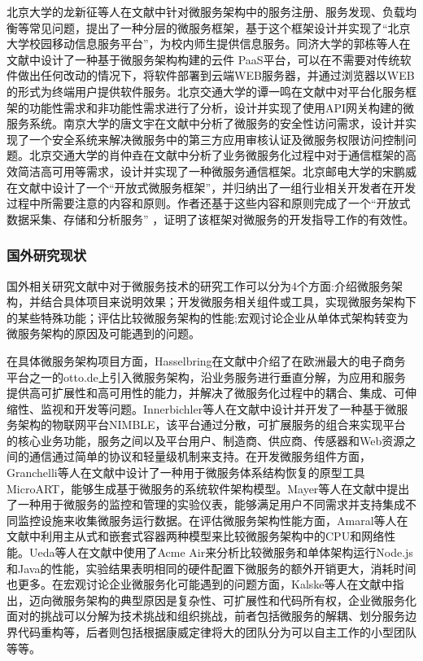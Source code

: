 北京大学的龙新征等人在文献\cite{龙新征2017基于微服务框架的信息服务平台}中针对微服务架构中的服务注册、服务发现、负载均衡等常见问题，提出了一种分层的微服务框架，基于这个框架设计并实现了“北京大学校园移动信息服务平台”，为校内师生提供信息服务。同济大学的郭栋等人在文献\cite{郭栋2015一种基于微服务架构的新型云件}中设计了一种基于微服务架构构建的云件 PaaS平台，可以在不需要对传统软件做出任何改动的情况下，将软件部署到云端WEB服务器，并通过浏览器以WEB的形式为终端用户提供软件服务。北京交通大学的谭一鸣在文献\cite{谭一鸣2017基于微服务架构的平台化服务框架的设计与实现}中对平台化服务框架的功能性需求和非功能性需求进行了分析，设计并实现了使用API网关构建的微服务系统。南京大学的唐文宇在文献\cite{唐文宇2016面向}中分析了微服务的安全性访问需求，设计并实现了一个安全系统来解决微服务中的第三方应用审核认证及微服务权限访问控制问题。北京交通大学的肖仲垚在文献\cite{肖仲垚2017微服务通信框架的设计与实现}中分析了业务微服务化过程中对于通信框架的高效简洁高可用等需求，设计并实现了一种微服务通信框架。北京邮电大学的宋鹏威在文献\cite{宋鹏威2017开放式微服务框架的设计与应用}中设计了一个“开放式微服务框架”，并归纳出了一组行业相关开发者在开发过程中所需要注意的内容和原则。作者还基于这些内容和原则完成了一个“开放式数据采集、存储和分析服务” ，证明了该框架对微服务的开发指导工作的有效性。

\subsubsection{国外研究现状}
国外相关研究文献中对于微服务技术的研究工作可以分为4个方面:介绍微服务架构，并结合具体项目来说明效果；开发微服务相关组件或工具，实现微服务架构下的某些特殊功能；评估比较微服务架构的性能;宏观讨论企业从单体式架构转变为微服务架构的原因及可能遇到的问题。

在具体微服务架构项目方面，Hasselbring在文献\cite{hasselbring2017microservice}中介绍了在欧洲最大的电子商务平台之一的otto.de上引入微服务架构，沿业务服务进行垂直分解，为应用和服务提供高可扩展性和高可用性的能力，并解决了微服务化过程中的耦合、集成、可伸缩性、监视和开发等问题。Innerbichler等人在文献\cite{innerbichler2017nimble}中设计并开发了一种基于微服务架构的物联网平台NIMBLE，该平台通过分散，可扩展服务的组合来实现平台的核心业务功能，服务之间以及平台用户、制造商、供应商、传感器和Web资源之间的通信通过简单的协议和轻量级机制来支持。在开发微服务组件方面，Granchelli等人在文献\cite{granchelli2017microart}中设计了一种用于微服务体系结构恢复的原型工具MicroART，能够生成基于微服务的系统软件架构模型。Mayer等人在文献\cite{mayer2017dashboard}中提出了一种用于微服务的监控和管理的实验仪表，能够满足用户不同需求并支持集成不同监控设施来收集微服务运行数据。在评估微服务架构性能方面，Amaral等人在文献\cite{amaral2015performance}中利用主从式和嵌套式容器两种模型来比较微服务架构中的CPU和网络性能。Ueda等人在文献\cite{ueda2016workload}中使用了Acme Air来分析比较微服务和单体架构运行Node.js和Java的性能，实验结果表明相同的硬件配置下微服务的额外开销更大，消耗时间也更多。在宏观讨论企业微服务化可能遇到的问题方面，Kalske等人在文献\cite{kalske2017challenges}中指出，迈向微服务架构的典型原因是复杂性、可扩展性和代码所有权，企业微服务化面对的挑战可以分解为技术挑战和组织挑战，前者包括微服务的解耦、划分服务边界代码重构等，后者则包括根据康威定律将大的团队分为可以自主工作的小型团队等等。


